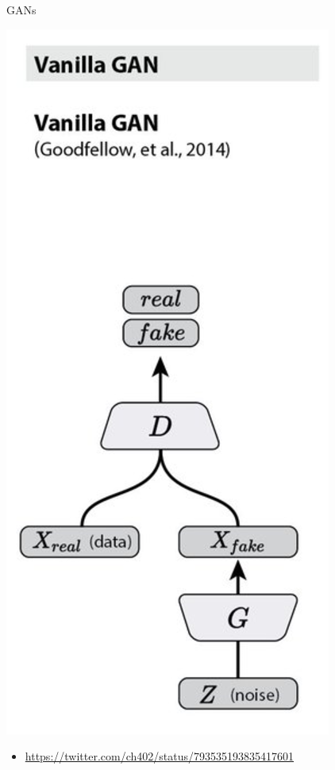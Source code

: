 \documentclass{beamer}
\begin{document}
\begin{frame}{GANs}{}

  \begin{center}
    \includegraphics[height=0.6\textheight]{vanilla_gan}
  \end{center}
  
  \begin{itemize}
  \item {
    \url{https://twitter.com/ch402/status/793535193835417601}
  }
  \end{itemize}
\end{frame}
\end{document}
